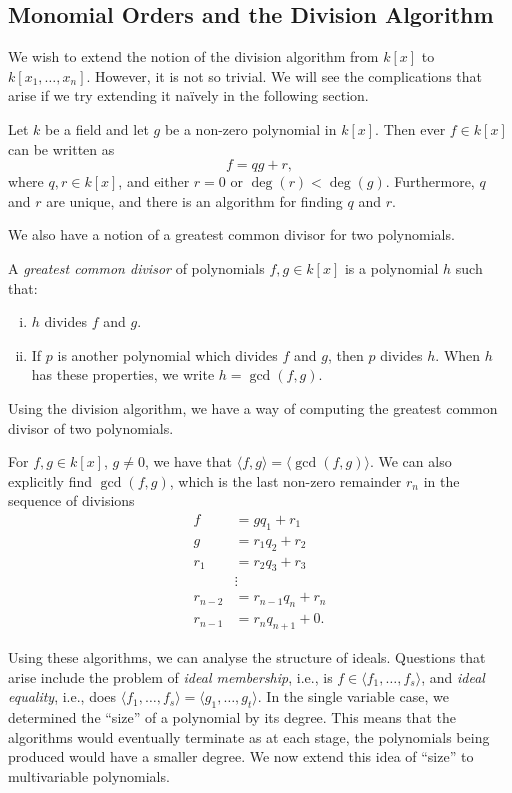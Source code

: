 \documentclass[../main.tex]{subfiles}
\begin{document}
    \subsection{Monomial Orders and the Division Algorithm}

    We wish to extend the notion of the division algorithm from $k[x]$ to $k[x_1,\dots,x_n]$. However, it is not so trivial. We will see the complications that arise if we try extending it na\"ively in the following section.

    \begin{theorem}
        Let $k$ be a field and let $g$ be a non-zero polynomial in $k[x]$. Then ever $f\in k[x]$ can be written as $$f=qg+r,$$ where $q,r\in k[x]$, and either $r=0$ or $\deg(r)<\deg(g)$. Furthermore, $q$ and $r$ are unique, and there is an algorithm for finding $q$ and $r$.
    \end{theorem}
    We also have a notion of a greatest common divisor for two polynomials.
    \begin{definition}
        A \emph{greatest common divisor} of polynomials $f,g\in k[x]$ is a polynomial $h$ such that:
        \begin{enumerate}[(i)]
            \item $h$ divides $f$ and $g$.
            \item If $p$ is another polynomial which divides $f$ and $g$, then $p$ divides $h$. When $h$ has these properties, we write $h=\gcd(f,g)$.
        \end{enumerate}
    \end{definition}
    Using the division algorithm, we have a way of computing the greatest common divisor of two polynomials.
    \begin{theorem}
        For $f,g\in k[x]$, $g\neq0$, we have that $\langle f,g\rangle =\langle \gcd(f,g)\rangle$. We can also explicitly find $\gcd(f,g)$, which is the last non-zero remainder $r_n$ in the sequence of divisions
        \begin{align*}
            f&=gq_1+r_1 \\
            g &= r_1q_2+r_2\\
            r_1 &= r_2q_3+r_3 \\
            &\vdots \\
            r_{n-2}&=r_{n-1}q_n+r_n \\
            r_{n-1} &= r_nq_{n+1}+0.
        \end{align*}
    \end{theorem}
    Using these algorithms, we can analyse the structure of ideals. Questions that arise include the problem of \emph{ideal membership}, i.e., is $f\in \langle f_1,\dots,f_s\rangle$, and \emph{ideal equality}, i.e., does $\langle f_1,\dots,f_s\rangle = \langle g_1,\dots,g_t\rangle$. In the single variable case, we determined the ``size'' of a polynomial by its degree. This means that the algorithms would eventually terminate as at each stage, the polynomials being produced would have a smaller degree. We now extend this idea of ``size'' to multivariable polynomials.
\end{document}
